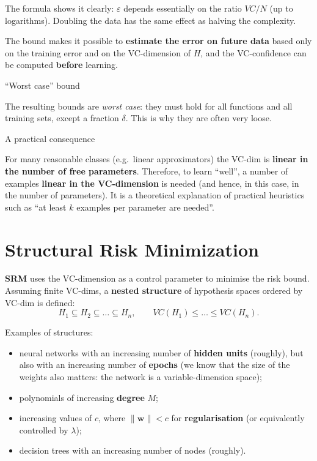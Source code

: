 The formula shows it clearly: \(\varepsilon\) depends essentially on
the ratio \(VC/N\) (up to logarithms). Doubling the data has the same
effect as halving the complexity.

The bound makes it possible to \textbf{estimate the error on future
data} based only on the training error and on the VC-dimension of
\(H\), and the VC-confidence can be computed \textbf{before} learning.

\begin{boxwarning}{``Worst case'' bound}

The resulting bounds are \emph{worst case}: they must hold for all
functions and all training sets, except a fraction \(\delta\). This is
why they are often very loose.

\end{boxwarning}

\begin{boxtip}{A practical consequence}

For many reasonable classes (e.g.\ linear approximators) the VC-dim is
\textbf{linear in the number of free parameters}. Therefore, to learn
``well'', a number of examples \textbf{linear in the VC-dimension} is
needed (and hence, in this case, in the number of parameters). It is a
theoretical explanation of practical heuristics such as ``at least
\(k\) examples per parameter are needed''.

\end{boxtip}

\section{Structural Risk
Minimization}\label{structural-risk-minimization}

\textbf{SRM} uses the VC-dimension as a control parameter to minimise
the risk bound. Assuming finite VC-dims, a \textbf{nested structure} of
hypothesis spaces ordered by VC-dim is defined: \[
H_1 \subseteq H_2 \subseteq \dots \subseteq H_n, \qquad VC(H_1) \le \dots \le VC(H_n).
\]

Examples of structures:

\begin{itemize}
\tightlist
\item
  neural networks with an increasing number of \textbf{hidden units}
  (roughly), but also with an increasing number of \textbf{epochs} (we
  know that the size of the weights also matters: the network is a
  variable-dimension space);
\item
  polynomials of increasing \textbf{degree} \(M\);
\item
  increasing values of \(c\), where \(\|\mathbf{w}\| < c\) for
  \textbf{regularisation} (or equivalently controlled by \(\lambda\));
\item
  decision trees with an increasing number of nodes (roughly).
\end{itemize}

